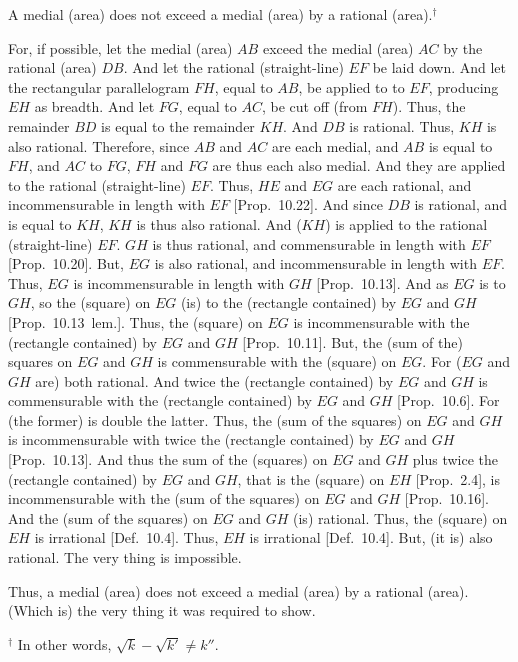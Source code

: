 \begin{Parallel}{}{}
{A medial (area) does not exceed a medial
(area) by a rational (area).$^\dag$

\epsfysize=1.8in
\centerline{}

For, if possible, let the medial (area) $AB$ exceed the medial (area) $AC$
by the rational (area) $DB$. And let the rational (straight-line)
$EF$ be laid down. And let the rectangular parallelogram $FH$, equal to $AB$, be
applied to to $EF$, producing $EH$ as breadth. And let $FG$, equal to
$AC$, be cut off (from $FH$). Thus, the remainder $BD$
is equal to the remainder $KH$. And $DB$ is rational. Thus, $KH$
is also rational. Therefore, since $AB$ and $AC$ are each medial, and
$AB$ is equal to $FH$, and $AC$ to $FG$, $FH$ and $FG$ are thus each also medial. And they are applied to the rational (straight-line)
$EF$. Thus, $HE$ and $EG$ are each rational, and incommensurable
in length with $EF$ [Prop.~10.22]. 
And since $DB$ is rational, and is equal to $KH$, $KH$ is thus  also
rational. And ($KH$) is  applied to the rational (straight-line)
$EF$. $GH$ is thus rational, and commensurable in length with
$EF$ [Prop.~10.20]. But, $EG$ is also
rational, and incommensurable in length with $EF$. Thus, $EG$ is
incommensurable in length with $GH$ [Prop.~10.13]. And as $EG$ is to $GH$, so the
(square) on $EG$ (is) to the (rectangle contained) by $EG$ and
$GH$ [Prop.~10.13~lem.]. Thus, the (square)
on $EG$ is incommensurable with the (rectangle contained) by 
$EG$ and $GH$ [Prop.~10.11]. 
But, the (sum of the) squares on $EG$ and $GH$ is commensurable with
the (square) on $EG$. For ($EG$ and $GH$ are) both rational.
And twice the (rectangle contained) by $EG$ and $GH$ is commensurable
with the (rectangle contained) by $EG$ and $GH$ [Prop.~10.6]. For (the former) is double the latter.
Thus, the (sum of the squares) on $EG$ and $GH$ is incommensurable
with twice the (rectangle contained) by $EG$ and $GH$
[Prop.~10.13]. 
And thus the sum of the (squares) on $EG$ and $GH$ plus twice the (rectangle contained) by
$EG$ and $GH$, that is the (square) on $EH$ [Prop.~2.4], is incommensurable with the (sum
of the squares) on $EG$ and $GH$ [Prop.~10.16].
And the (sum of the squares) on $EG$ and $GH$ (is) rational. 
Thus, the (square) on $EH$ is irrational [Def.~10.4].
Thus, $EH$ is irrational  [Def.~10.4]. But,
(it is) also rational. The very thing is impossible.

Thus, a medial (area) does not exceed a medial
(area) by a rational (area). (Which is) the very thing it was required to show.}
\end{Parallel}
{\footnotesize\noindent$^\dag$ In other words, $\sqrt{k}-\sqrt{k'}\neq k''$.}

